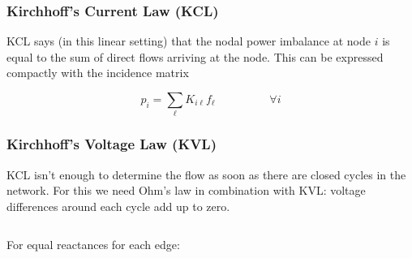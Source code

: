 \documentclass[10pt,aspectratio=169,dvipsnames]{beamer}
\begin{document}
\begin{frame}
  \frametitle{Kirchhoff's Current Law (KCL)}

  KCL says (in this linear setting) that the nodal power imbalance at
  node $i$ is equal to the sum of direct flows arriving at the
  node. This can be expressed compactly with the incidence matrix

  \begin{equation*}
    p_i = \sum_\ell K_{i\ell} f_\ell \hspace{2cm} \forall i
  \end{equation*}


\end{frame}



\begin{frame}
  \frametitle{Kirchhoff's Voltage Law (KVL)}

  KCL isn't enough to determine the flow as soon as there are \alert{closed cycles} in the network.
   For this we need Ohm's law in combination with KVL: voltage
  differences around each cycle add up to zero.

  \vspace{.3cm}

  \begin{columns}


    \centering





      For equal reactances for each edge:


  \vspace{.3cm}


\end{columns}
\end{frame}
\end{document}
